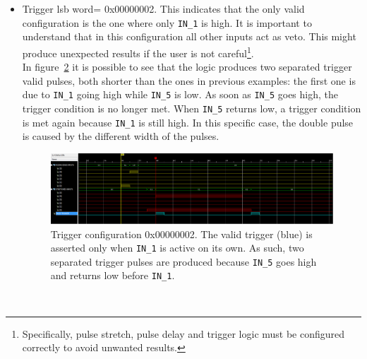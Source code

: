 \begin{itemize}
\begin{figure}
            \label{Fig:exampleTrig00020002}
        \end{figure}\\
    \item Trigger \gls{lsb} word= 0x00000002. This indicates that the only valid configuration is the one where only \verb|IN_1| is high. It is important to understand that in this configuration all other inputs act as veto. This might produce unexpected results if the user is not careful\footnote{Specifically, pulse stretch, pulse delay and trigger logic must be configured correctly to avoid unwanted results.}.\\
        In figure~\ref{Fig:exampleTrig00000002} it is possible to see that the logic produces two separated trigger valid pulses, both shorter than the ones in previous examples: the first one is due to \verb|IN_1| going high while \verb|IN_5| is low. As soon as \verb|IN_5| goes high, the trigger condition is no longer met. When \verb|IN_5| returns low, a trigger condition is met again because \verb|IN_1| is still high. In this specific case, the double pulse is caused by the different width of the pulses.
        \begin{figure}
            \centering
            \includegraphics[width=.90\textwidth]{./Images/Trigger0x00000002.png}
            \caption{Trigger configuration 0x00000002. The valid trigger (blue) is asserted only when \texttt{IN\_1} is active on its own. As such, two separated trigger pulses are produced because \texttt{IN\_5} goes high and returns low before \texttt{IN\_1}.}
            \label{Fig:exampleTrig00000002}
        \end{figure}\\
\end{itemize}

